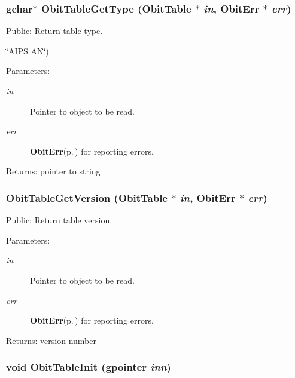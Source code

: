 \subsubsection{\setlength{\rightskip}{0pt plus 5cm}gchar$\ast$ Obit\-Table\-Get\-Type ({\bf Obit\-Table} $\ast$ {\em in}, {\bf Obit\-Err} $\ast$ {\em err})}\label{ObitTable_8c_a33}


Public: Return table type. 

\char`\"{}AIPS AN\char`\"{}) \begin{Desc}
\item[Parameters:]
\begin{description}
\item[{\em in}]Pointer to object to be read. \item[{\em err}]{\bf Obit\-Err}{\rm (p.\,\pageref{structObitErr})} for reporting errors. \end{description}
\end{Desc}
\begin{Desc}
\item[Returns:]pointer to string \end{Desc}
\subsubsection{ Obit\-Table\-Get\-Version ({\bf Obit\-Table} $\ast$ {\em in}, {\bf Obit\-Err} $\ast$ {\em err})}\label{ObitTable_8c_a34}


Public: Return table version. 

\begin{Desc}
\item[Parameters:]
\begin{description}
\item[{\em in}]Pointer to object to be read. \item[{\em err}]{\bf Obit\-Err}{\rm (p.\,\pageref{structObitErr})} for reporting errors. \end{description}
\end{Desc}
\begin{Desc}
\item[Returns:]version number \end{Desc}
\subsubsection{\setlength{\rightskip}{0pt plus 5cm}void Obit\-Table\-Init (gpointer {\em inn})}\label{ObitTable_8c_a8}


